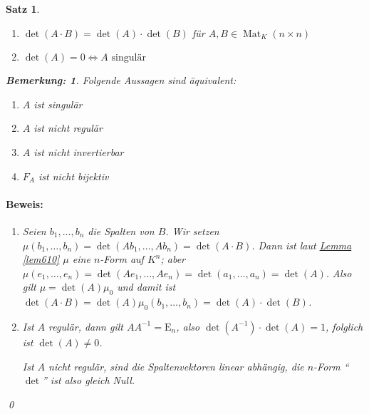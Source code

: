 \documentclass{report}
\DeclareMathOperator{\Mat}{Mat}
\newcommand{\En}{\mathrm{E}_n}
\theoremstyle{customrem}
\newtheorem*{bemerkung}{Bemerkung\textnormal:}
\theoremstyle{customdef}
\newtheorem{satz}[definition]{Satz}
\renewenvironment{proof}{\paragraph{Beweis: }}{\qed}
\theoremstyle{customenv}
\begin{document}
	\begin{satz}\( \)\vspace{-.5cm} %
		\begin{enumerate}
			\item \(\det(A\cdot B) = \det(A)\cdot\det(B)\) für \(A,B\in\Mat_K(n\times n)\)
			\item \(\det(A) = 0\iff A\text{ singulär}\)
		\end{enumerate}
		\begin{bemerkung}
			Folgende Aussagen sind äquivalent:
			\begin{enumerate}[leftmargin=6cm]
				\item \(A\) ist singulär
				\item \(A\) ist nicht regulär
				\item \(A\) ist nicht invertierbar
				\item \(F_A\) ist nicht bijektiv
			\end{enumerate} 
		\end{bemerkung}
		\begin{proof}
			\begin{enumerate}
				\item Seien \(b_1,\ldots, b_n\) die Spalten von \(B\). Wir setzen \(\mu(b_1,\ldots, b_n) = \det(Ab_1,\ldots, Ab_n) = \det(A\cdot B)\). Dann ist laut \hyperref[lem610]{Lemma \ref*{lem610}} \(\mu\) eine \(n\)-Form auf \(K^n\); aber \(\mu(e_1,\ldots, e_n) = \det(Ae_1,\ldots, Ae_n) = \det(a_1,\ldots, a_n) = \det(A)\). Also gilt \(\mu=\det(A)\mu_0\) und damit ist \(\det(A\cdot B) = \det(A)\mu_0(b_1,\ldots, b_n)=\det(A)\cdot\det(B)\).
				\item Ist \(A\) regulär, dann gilt \(AA^{-1}=\En\), also \(\det(A^{-1})\cdot\det(A)=1\), folglich ist \(\det(A)\neq 0\).
				
				Ist \(A\) nicht regulär, sind die Spaltenvektoren linear abhängig, die \(n\)-Form "`\(\det\)"' ist also gleich Null.
			\end{enumerate}
		\end{proof}
	\end{satz}
	
\end{document}
